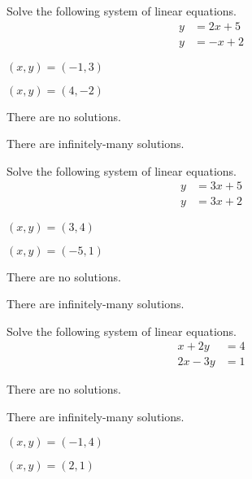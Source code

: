 \documentclass{article}
\begin{document}
\begin{readinessAssuranceTest}
\item Solve the following system of linear equations.
      \begin{align*}
      y   &=   2x+5 \\
      y  &=  -x+2
      \end{align*}

\begin{multicols}{4}
\begin{readinessAssuranceTestChoices}
\item \((x,y)=(-1,3)\) %
\item \((x,y)=(4,-2)\)
\item There are no solutions.
\item There are infinitely-many solutions.
\end{readinessAssuranceTestChoices}
\end{multicols}


\item Solve the following system of linear equations.
      \begin{align*}
      y   &=  3x+5 \\
      y  &=  3x+2
      \end{align*}

\begin{multicols}{4}
\begin{readinessAssuranceTestChoices}
\item
\((x,y)=(3,4)\)
\item
\((x,y)=(-5,1)\)
\item There are no solutions. %
\item There are infinitely-many solutions.
\end{readinessAssuranceTestChoices}
\end{multicols}


\item Solve the following system of linear equations.
      \begin{align*}
      x+2y   &=   4 \\
      2x-3y  &=  1
      \end{align*}

\begin{multicols}{4}
\begin{readinessAssuranceTestChoices}
\item There are no solutions.
\item There are infinitely-many solutions.
\item
\((x,y)=(-1,4)\)
\item
\((x,y)=(2,1)\) %
\end{readinessAssuranceTestChoices}
\end{multicols}



\end{readinessAssuranceTest}
\end{document}
